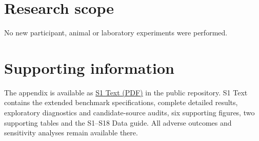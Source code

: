 \documentclass[11pt,a4paper]{article}
\begin{document}
\section*{Research scope}
No new participant, animal or laboratory experiments were performed.

\section*{Supporting information}
The appendix is available as \href{https://github.com/Kohze/microprotein-score-transfer/blob/v0.1.1/paper/S1_Text.pdf}{S1 Text (PDF)} in the public repository. S1 Text contains the extended benchmark specifications, complete detailed
results, exploratory diagnostics and candidate-source audits, six
supporting figures, two supporting tables and the S1--S18 Data guide.
All adverse outcomes and sensitivity analyses remain available there.
\end{document}
